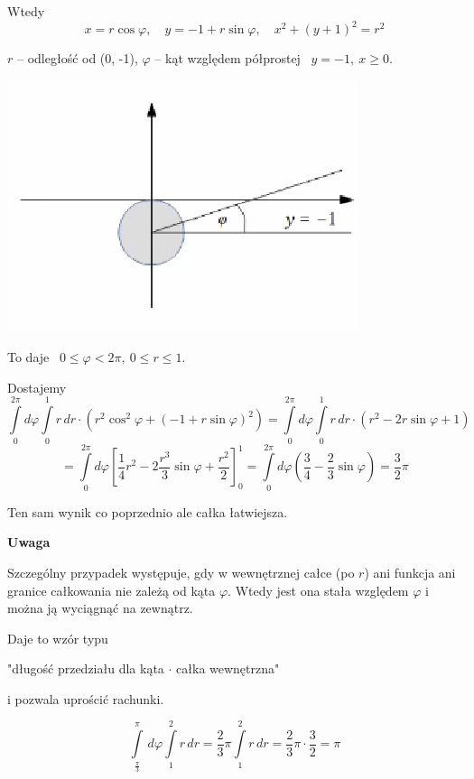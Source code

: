 \begin{przykladbig}
    Wtedy
    \[ x = r \cos \varphi, \quad y = -1 + r \sin \varphi, \quad x^2 + (y+1)^2 = r^2 \]

    $r$ -- odległość od (0, -1),
    $\varphi $ -- kąt względem półprostej \ $ y = -1, \ x \geq 0 $.

    \includegraphics[scale=0.6]{img/okragikat.png}

    To daje \ $ 0 \leq \varphi < 2\pi, \ 0 \leq r \leq 1 $.

    Dostajemy
    \[ \int\limits_{0}^{2\pi} d \varphi \int\limits_{0}^{1} r \, dr \cdot (r^2 \cos^2 \varphi + (-1 + r \sin \varphi)^2) 
    = \int\limits_{0}^{2\pi} d \varphi \int\limits_{0}^{1} r \, dr \cdot (r^2 - 2r \sin \varphi + 1) \]
    \[ = \int\limits_{0}^{2\pi} d \varphi \left[ \frac{1}{4} r^2 - 2 \frac{r^3}{3} \sin \varphi + \frac{r^2}{2} \right]_0^1
    = \int\limits_{0}^{2\pi} d \varphi \left( \frac{3}{4} - \frac{2}{3} \sin \varphi \right) = \frac{3}{2} \pi \]

    Ten sam wynik co poprzednio ale całka łatwiejsza.
\end{przykladbig}

\textbf{Uwaga}

Szczególny przypadek występuje, gdy w wewnętrznej całce (po $r$) ani funkcja ani granice całkowania nie zależą od kąta $\varphi$.
Wtedy jest ona stała względem $\varphi$ i można ją wyciągnąć na zewnątrz.

Daje to wzór typu

\begin{center}
"długość przedziału dla kąta $\cdot$ całka wewnętrzna"
\end{center}

i pozwala uprościć rachunki.

\begin{przyklad}
    \[ \int\limits_{\frac{\pi}{3}}^{\pi} \, d\varphi \int\limits_{1}^{2} r\, dr = \frac{2}{3} \pi \int\limits_{1}^{2} r\, dr = \frac{2}{3}\pi \cdot \frac{3}{2} = \pi \]
\end{przyklad}

